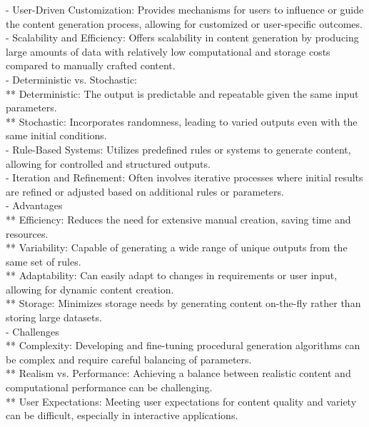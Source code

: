 - User-Driven Customization: Provides mechanisms for users to influence or guide the content generation process, allowing for customized or user-specific outcomes. \\
- Scalability and Efficiency: Offers scalability in content generation by producing large amounts of data with relatively low computational and storage costs compared to manually crafted content. \\
- Deterministic vs. Stochastic: \\
** Deterministic: The output is predictable and repeatable given the same input parameters. \\
** Stochastic: Incorporates randomness, leading to varied outputs even with the same initial conditions. \\
- Rule-Based Systems: Utilizes predefined rules or systems to generate content, allowing for controlled and structured outputs. \\
- Iteration and Refinement: Often involves iterative processes where initial results are refined or adjusted based on additional rules or parameters. \\
- Advantages \\
** Efficiency: Reduces the need for extensive manual creation, saving time and resources. \\
** Variability: Capable of generating a wide range of unique outputs from the same set of rules. \\
** Adaptability: Can easily adapt to changes in requirements or user input, allowing for dynamic content creation. \\
** Storage: Minimizes storage needs by generating content on-the-fly rather than storing large datasets. \\
- Challenges \\
** Complexity: Developing and fine-tuning procedural generation algorithms can be complex and require careful balancing of parameters. \\
** Realism vs. Performance: Achieving a balance between realistic content and computational performance can be challenging. \\
** User Expectations: Meeting user expectations for content quality and variety can be difficult, especially in interactive applications.


